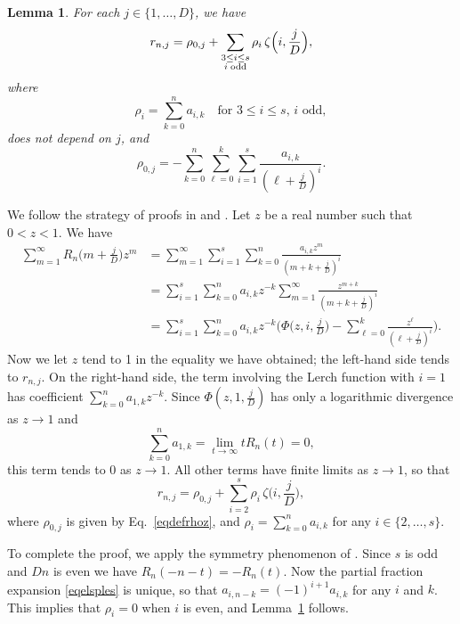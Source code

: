 \documentclass{article}
\numberwithin{equation}{section}
\newtheorem{Lem}{Lemma}
\theoremstyle{remark}
\newenvironment{Proof}[1][Proof]{\proof[\rm\textbf{#1}]}{\endproof}
\begin{document}
\begin{Lem} \label{lemconstru}
For each $j\in \{1,\ldots,D\}$, we have
$$r_{n,j} 
 = \rho_{0,j}+\sum_{\substack{3\leq i \leq s\\i \;\mbox{\scriptsize odd}}} \rho_i \, \zeta\Big(i, \frac{j}{D}\Big),$$
where
$$\rho_i = \sum_{k=0}^n a_{i,k} \quad\mbox{for $3\leq i \leq s$, \ $i$ odd},$$
does not depend on $j$, and 
\begin{equation} \label{eqdefrhoz}
 \rho_{0,j} = - \sum_{k=0}^n \sum_{\ell=0}^k \sum_{i=1}^s \frac{ a_{i,k}}{(\ell+\frac{j}{D})^i} .
 \end{equation}
\end{Lem}

\begin{Proof}
We follow the strategy of proofs in \cite[Lemma~3]{Zudilintrick} and \cite[Lemma~1.5]{Sprang}. Let $z$ be a real number such that $0<z<1$. We have
\begin{align*}
\sum_{m=1}^\infty R_n\Big(m+\frac{j}{D}\Big) z^m 
&= \sum_{m=1}^\infty \sum_{i=1}^s \sum_{k=0}^n \frac{a_{i,k} z^m }{(m+k+\frac{j}{D})^i} \\
&= \sum_{i=1}^s \sum_{k=0}^n a_{i,k} z^{-k} \sum_{m=1}^\infty\frac{ z^{m+k} }{(m+k+\frac{j}{D})^i} \\
&= \sum_{i=1}^s \sum_{k=0}^n a_{i,k} z^{-k} \bigg( \Phi\Big(z, i, \frac{j}{D}\Big) - \sum_{\ell = 0}^k \frac{z^\ell}{(\ell+\frac{j}{D})^i} \bigg).
 \end{align*}
Now we let $z$ tend to 1 in the equality we have obtained; the left-hand side tends to $r_{n,j} $. On the right-hand side, the term involving the Lerch function with $i=1$ has coefficient $\sum_{k=0}^n a_{1,k} z^{-k} $. Since $ \Phi(z,1,\frac{j}{D}) $ has only a logarithmic divergence as $z\to 1$ and
$$
\sum_{k=0}^n a_{1,k} =\lim_{t\to \infty } t R_n(t) =0,
$$
this term tends to 0 as $z\to1$. All other terms have finite limits as $z\to 1$, so that
$$r_{n,j} = \rho_{0,j}+\sum_{i=2}^s \rho_i \, \zeta\Big(i, \frac{j}{D}\Big),$$
where $ \rho_{0,j} $ is given by Eq.~\eqref{eqdefrhoz}, and $ \rho_i = \sum_{k=0}^n a_{i,k} $ for any $i\in \{2,\ldots,s\}$. 
 
 \bigskip
 
To complete the proof, we apply the symmetry phenomenon of \cite{BR, RivoalCRAS}. Since $s$ is odd and $Dn $ is even we have $R_n(-n-t) = - R_n(t)$. Now the partial fraction expansion \eqref{eqelsples} is unique, so that $a_{i,n-k} = (-1)^{i+1} a_{i,k}$ for any $i$ and $k$. This implies that $\rho_i = 0$ when $i$ is even, and Lemma~\ref{lemconstru} follows.
\end{Proof}
\end{document}

